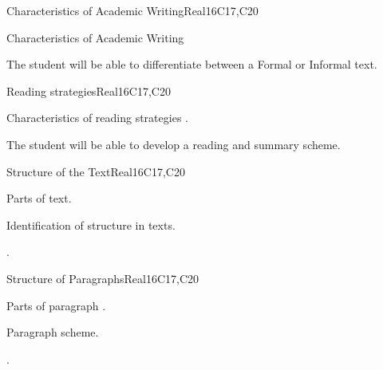 \begin{syllabus}
\begin{unit}{Characteristics of Academic Writing}{}{Real}{16}{C17,C20}
  \begin{topics}
      \item Characteristics of Academic Writing
  \end{topics}

  \begin{learningoutcomes}
   \item The student will be able to differentiate between a Formal or Informal text.
  \end{learningoutcomes}
\end{unit}

\begin{unit}{Reading strategies}{}{Real}{16}{C17,C20}
  \begin{topics}
      \item Characteristics of reading strategies .
  \end{topics}

  \begin{learningoutcomes}
   \item The student will be able to develop a reading and summary scheme.
  \end{learningoutcomes}
\end{unit}

\begin{unit}{Structure of the Text}{}{Real}{16}{C17,C20}
  \begin{topics}
      \item Parts of text.
      \item Identification of structure in texts.
  \end{topics}

  \begin{learningoutcomes}
   \item .%
  \end{learningoutcomes}
\end{unit}

\begin{unit}{Structure of Paragraphs}{}{Real}{16}{C17,C20}
  \begin{topics}
      \item Parts of paragraph .
      \item Paragraph scheme.
  \end{topics}

  \begin{learningoutcomes}
   \item .%
  \end{learningoutcomes}
\end{unit}


\end{syllabus}
